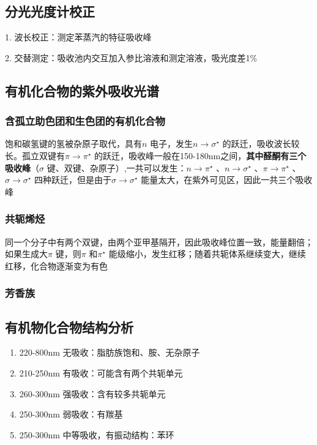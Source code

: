 \subsection{分光光度计校正}%
\label{sub:分光光度计校正}
1. 波长校正：测定苯蒸汽的特征吸收峰

2. 交替测定：吸收池内交互加入参比溶液和测定溶液，吸光度差1\%
\subsection{有机化合物的紫外吸收光谱}%
\label{sub:有机化合物的紫外吸收光谱}
\subsubsection*{含孤立助色团和生色团的有机化合物}%
\label{subsub*:含孤立助色团和生色团的有机化合物}
饱和碳氢键的氢被杂原子取代，具有$n$ 电子，发生$n\to \sigma^\star $ 的跃迁，吸收波长较长。孤立双键有$\pi \to \pi ^\star $ 的跃迁，吸收峰一般在150-180nm之间，\textbf{其中醛酮有三个吸收峰}（$\sigma$ 键、双键、杂原子）,一共可以发生：$n\to \pi ^\star $ 、$n\to \sigma^\star $ 、$\pi \to \pi ^\star $ 、$\sigma\to \sigma^\star $ 四种跃迁，但是由于$\sigma\to \sigma^\star $ 能量太大，在紫外可见区，因此一共三个吸收峰
\subsubsection*{共轭烯烃}%
\label{subsub*:共轭烯烃}
同一个分子中有两个双键，由两个亚甲基隔开，因此吸收峰位置一致，能量翻倍；如果生成大$\pi $ 键，则$\pi $ 和$\pi ^\star $ 能级缩小，发生红移；随着共轭体系继续变大，继续红移，化合物逐渐变为有色
\subsubsection*{芳香族}%
\label{subsub*:芳香族}
\subsection{有机物化合物结构分析}%
\label{sub:有机物化合物结构分析}
\begin{enumerate}
    \item 220-800nm 无吸收：脂肪族饱和、胺、无杂原子
    \item 210-250nm 有吸收：可能含有两个共轭单元
    \item 260-300nm 强吸收：含有较多共轭单元
    \item 250-300nm 弱吸收：有羰基
    \item 250-300nm 中等吸收，有振动结构：苯环
\end{enumerate}
